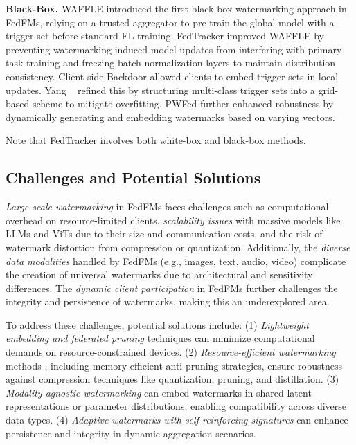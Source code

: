 \textbf{Black-Box.} WAFFLE \cite{atli2021wafflewatermarkingfederatedlearning} introduced the first black-box watermarking approach in FedFMs, relying on a trusted aggregator to pre-train the global model with a trigger set before standard FL training. FedTracker \cite{shao2024fedtrackerfurnishingownershipverification} improved WAFFLE by preventing watermarking-induced model updates from interfering with primary task training and freezing batch normalization layers to maintain distribution consistency. Client-side Backdoor \cite{9658998} allowed clients to embed trigger sets in local updates. Yang \et~ \cite{yang2023watermarkingsecurefederatedlearning} refined this by structuring multi-class trigger sets into a grid-based scheme to mitigate overfitting. PWFed \cite{electronics13214306} further enhanced robustness by dynamically generating and embedding watermarks based on varying vectors.

Note that FedTracker involves both white-box and black-box methods.




\subsection{Challenges and Potential Solutions}
\textit{Large-scale watermarking} in FedFMs faces challenges such as computational overhead on resource-limited clients, \textit{scalability issues} with massive models like LLMs and ViTs due to their size and communication costs, and the risk of watermark distortion from compression or quantization. Additionally, the \textit{diverse data modalities} handled by FedFMs (e.g., images, text, audio, video) complicate the creation of universal watermarks due to architectural and sensitivity differences. The \textit{dynamic client participation} in FedFMs further challenges the integrity and persistence of watermarks, making this an underexplored area. %




To address these challenges, potential solutions include: (1) \textit{Lightweight embedding and federated pruning} techniques \cite{jiang2022modelpruningenablesefficient, lin2022federatedpruningimprovingneural} can minimize computational demands on resource-constrained devices. (2) \textit{Resource-efficient watermarking} methods \cite{jimaging8060152}, including memory-efficient anti-pruning strategies, ensure robustness against compression techniques like quantization, pruning, and distillation. (3) \textit{Modality-agnostic watermarking }
\cite{tang2023watermarkingvisionlanguagepretrainedmodels} can embed watermarks in shared latent representations or parameter distributions, enabling compatibility across diverse data types. (4) \textit{Adaptive watermarks with self-reinforcing signatures} can enhance persistence and integrity in dynamic aggregation scenarios.

